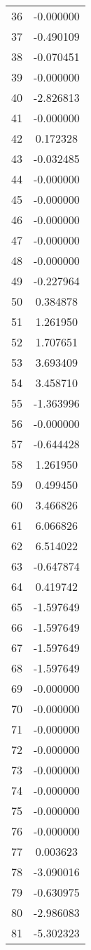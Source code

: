 \documentclass[12pt]{article}
\begin{document}
\begin{longtable}{@{}cc@{}}
36 & -0.000000 \\
37 & -0.490109 \\
38 & -0.070451 \\
39 & -0.000000 \\
40 & -2.826813 \\
41 & -0.000000 \\
42 & 0.172328 \\
43 & -0.032485 \\
44 & -0.000000 \\
45 & -0.000000 \\
46 & -0.000000 \\
47 & -0.000000 \\
48 & -0.000000 \\
49 & -0.227964 \\
50 & 0.384878 \\
51 & 1.261950 \\
52 & 1.707651 \\
53 & 3.693409 \\
54 & 3.458710 \\
55 & -1.363996 \\
56 & -0.000000 \\
57 & -0.644428 \\
58 & 1.261950 \\
59 & 0.499450 \\
60 & 3.466826 \\
61 & 6.066826 \\
62 & 6.514022 \\
63 & -0.647874 \\
64 & 0.419742 \\
65 & -1.597649 \\
66 & -1.597649 \\
67 & -1.597649 \\
68 & -1.597649 \\
69 & -0.000000 \\
70 & -0.000000 \\
71 & -0.000000 \\
72 & -0.000000 \\
73 & -0.000000 \\
74 & -0.000000 \\
75 & -0.000000 \\
76 & -0.000000 \\
77 & 0.003623 \\
78 & -3.090016 \\
79 & -0.630975 \\
80 & -2.986083 \\
81 & -5.302323 \\

\end{longtable}
\end{document}
